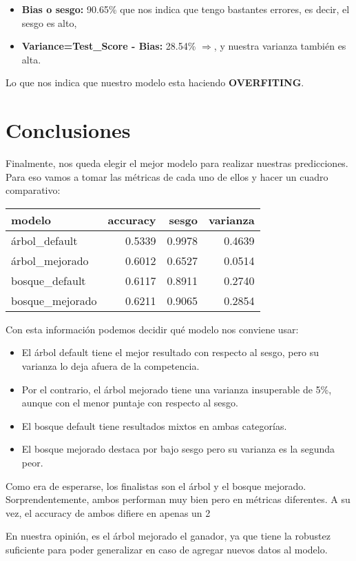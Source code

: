 \documentclass[a4paper]{article}
\begin{document}
            \begin{itemize}
                \item \textbf{Bias o sesgo:} 90.65\% que nos indica que tengo bastantes errores, es decir, el sesgo es alto,
                \item \textbf{Variance=Test\_Score - Bias:} 28.54\% $\Rightarrow$, y nuestra varianza también es alta. 
            \end{itemize} 

            Lo que nos indica que nuestro modelo esta haciendo \textbf{OVERFITING}.

\newpage

\section{Conclusiones}

    Finalmente, nos queda elegir el mejor modelo para realizar nuestras predicciones. Para eso vamos a tomar las métricas de cada uno de ellos y hacer un cuadro comparativo:
    
    \begin{table}[H]
        \centering
        \begin{tabular}{|l|r|r|r|}
        \hline
            modelo & accuracy & sesgo & varianza \\ \hline
            árbol\_default & 0.5339 & 0.9978 & 0.4639 \\ \hline
            árbol\_mejorado & 0.6012 & 0.6527 & 0.0514 \\ \hline
            bosque\_default & 0.6117 & 0.8911 & 0.2740 \\ \hline
            bosque\_mejorado & 0.6211 & 0.9065 & 0.2854 \\ \hline
        \end{tabular}
    \end{table}

    Con esta información podemos decidir qué modelo nos conviene usar:
    \begin{itemize}
        \item El árbol default tiene el mejor resultado con respecto al sesgo, pero su varianza lo deja afuera de la competencia.
        \item Por el contrario, el árbol mejorado tiene una varianza insuperable de 5\%, aunque con el menor puntaje con respecto al sesgo.
        \item El bosque default tiene resultados mixtos en ambas categorías.
        \item El bosque mejorado destaca por bajo sesgo pero su varianza es la segunda peor.
    \end{itemize}
    Como era de esperarse, los finalistas son el árbol y el bosque mejorado. Sorprendentemente, ambos performan muy bien pero en métricas diferentes. A su vez, el accuracy de ambos difiere en apenas un 2%

    En nuestra opinión, es el árbol mejorado el ganador, ya que tiene la robustez suficiente para poder generalizar en caso de agregar nuevos datos al modelo.
        
\end{document}
